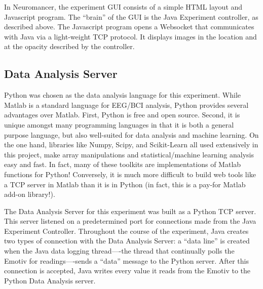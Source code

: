 \documentclass[11pt]{report}
\begin{document}
	In Neuromancer, the experiment GUI consists of a simple HTML layout and Javascript program.  The “brain” of the GUI is the Java Experiment controller, as described above.  The Javascript program opens a Websocket\cite{websocket} that communicates with Java via a light-weight TCP protocol.  It displays images in the location and at the opacity described by the controller.

\subsection{Data Analysis Server}
	Python was chosen as the data analysis language for this experiment.  While Matlab is a standard language for EEG/BCI analysis, Python provides several advantages over Matlab.  First, Python is free and open source.  Second, it is unique amongst many programming languages in that it is both a general purpose language, but also well-suited for data analysis and machine learning.  On the one hand, libraries like Numpy, Scipy\cite{scipy}, and Scikit-Learn\cite{sklearn} all used extensively in this project, make array manipulations and statistical/machine learning analysis easy and fast.  In fact, many of these toolkits are implementations of Matlab functions for Python!  Conversely, it is much more difficult to build web tools like a TCP server in Matlab than it is in Python (in fact, this is a pay-for Matlab add-on library!). 

	The Data Analysis Server for this experiment was built as a Python TCP server.  This server listened on a predetermined port for connections made from the Java Experiment Controller.  Throughout the course of the experiment, Java creates two types of connection with the Data Analysis Server: a ``data line'' is created when the Java data logging thread—-the thread that continually polls the Emotiv for readings—-sends a ``data'' message to the Python server.  After this connection is accepted, Java writes every value it reads from the Emotiv to the Python Data Analysis server.  
\end{document}
